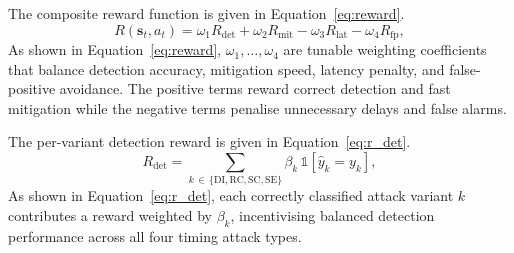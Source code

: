The composite reward function is given in
Equation~\eqref{eq:reward}.
\begin{equation}
R(\mathbf{s}_t,a_t) =
  \omega_1 R_{\mathrm{det}} +
  \omega_2 R_{\mathrm{mit}} -
  \omega_3 R_{\mathrm{lat}} -
  \omega_4 R_{\mathrm{fp}},
\label{eq:reward}
\end{equation}
As shown in Equation~\eqref{eq:reward},
$\omega_1,\ldots,\omega_4$ are tunable weighting coefficients
that balance detection accuracy, mitigation speed, latency
penalty, and false-positive avoidance. The positive terms
reward correct detection and fast mitigation while the
negative terms penalise unnecessary delays and false alarms.

The per-variant detection reward is given in
Equation~\eqref{eq:r_det}.
\begin{equation}
R_{\mathrm{det}} =
  \sum_{k\,\in\,\{\mathrm{DI,RC,SC,SE}\}}
  \beta_k\,\mathbb{1}[\hat{y}_k = y_k],
\label{eq:r_det}
\end{equation}
As shown in Equation~\eqref{eq:r_det}, each correctly
classified attack variant $k$ contributes a reward weighted
by $\beta_k$, incentivising balanced detection performance
across all four timing attack types.

